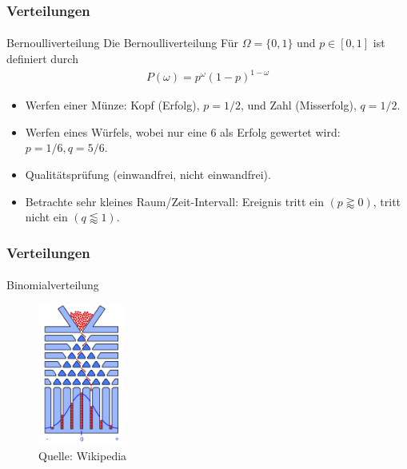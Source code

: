 \documentclass{beamer}
\begin{document}
\begin{frame}
    \frametitle{Verteilungen}
\framesubtitle{}

\begin{block}{Bernoulliverteilung}
Die Bernoulliverteilung  Für $\Omega = \{ 0, 1\}$ und $p \in [0,1]$ ist definiert durch
\begin{align*}
P (\omega) = p^{\omega} (1-p)^{1 -\omega}
\end{align*}
\end{block}

\begin{block}

\begin{itemize}
\item Werfen einer Münze: Kopf (Erfolg), $p=1/2$, und Zahl (Misserfolg), $q=1/2$.
\item Werfen eines Würfels, wobei nur eine 6 als Erfolg gewertet wird: $p=1/6, q=5/6$.
\item Qualitätsprüfung (einwandfrei, nicht einwandfrei).
\item Betrachte sehr kleines Raum/Zeit-Intervall: Ereignis tritt ein $(p \gtrapprox 0)$, tritt nicht ein $(q\lessapprox 1)$.
\end{itemize}

\end{block}
 \end{frame}




\begin{frame}
    \frametitle{ Verteilungen}
\framesubtitle{}

\begin{block}{Binomialverteilung}
\end{block}

\begin{figure}[htp]
      \centering
    \includegraphics[width=0.25\textwidth]{img/Galton}
      \caption{Quelle: Wikipedia}
\end{figure}
 \end{frame}
\end{document}
